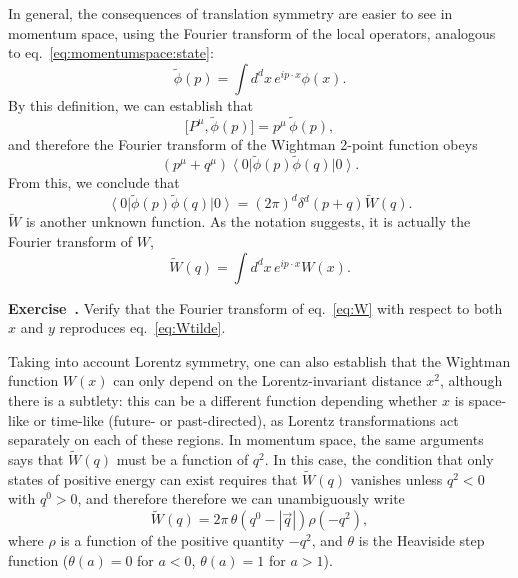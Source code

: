 \documentclass[a4paper,12pt]{article}
\newcommand{\ket}[1]{\left| #1 \right\rangle}
\newcommand{\bra}[1]{\left\langle #1 \right|}
\numberwithin{equation}{section}
\newcounter{exercise}[section]
\newenvironment{exercise}[1][]%
	{\refstepcounter{exercise}\bigskip
	\begin{mdframed}[backgroundcolor=gray!20, linewidth=0]
	\noindent\textbf{Exercise~\thesection.\theexercise #1} \rmfamily}
  	{\end{mdframed}\bigskip}
\begin{document}
In general, the consequences of translation symmetry are easier to see in momentum space, using the Fourier transform of the local operators, analogous to eq.~\eqref{eq:momentumspace:state}: 
\begin{equation}
	\widetilde{\phi}(p)
	= \int d^dx \, e^{i p \cdot x} \phi(x).
	\label{eq:momentumspace}
\end{equation}
By this definition, we can establish that
\begin{equation}
	\big[ P^\mu, \widetilde{\phi}(p) \big]
	= p^\mu \, \widetilde{\phi}(p),
	\label{eq:commutator:P:momentum}
\end{equation}
and therefore the Fourier transform of the Wightman 2-point function obeys
\begin{equation}
	(p^\mu + q^\mu)
	\bra{0} \widetilde{\phi}(p) \widetilde{\phi}(q) \ket{0}.
\end{equation}
From this, we conclude that
\begin{equation}
	\bra{0} \widetilde{\phi}(p) \widetilde{\phi}(q) \ket{0}
	= (2\pi)^d \delta^d(p + q) \widetilde{W}(q).
	\label{eq:Wtilde}
\end{equation}
$\widetilde{W}$ is another unknown function. As the notation suggests, it is actually the Fourier transform of $W$,
\begin{equation}
	\widetilde{W}(q) = \int d^dx \, e^{i p \cdot x} W(x).
\end{equation}
%
\begin{exercise}
	Verify that the Fourier transform of eq.~\eqref{eq:W}
	with respect to both $x$ and $y$ reproduces eq.~\eqref{eq:Wtilde}.
\end{exercise}



Taking into account Lorentz symmetry, one can also establish that the Wightman function $W(x)$ can only depend on the Lorentz-invariant distance $x^2$, although there is a subtlety: this can be a different function depending whether $x$ is space-like or time-like (future- or past-directed), as Lorentz transformations act separately on each of these regions.
In momentum space, the same arguments says that $\widetilde{W}(q)$ must be a function of $q^2$. In this case, the condition that only states of positive energy can exist requires that $\widetilde{W}(q)$ vanishes unless $q^2 < 0$ with $q^0 > 0$, and therefore therefore we can unambiguously write
\begin{equation}
	\widetilde{W}(q)
	= 2\pi \, \theta\left( q^0 - \left| \vec{q} \right| \right)
	\rho(-q^2),
	\label{eq:spectraldensity}
\end{equation}
where $\rho$ is a function of the positive quantity $-q^2$, and $\theta$ is the Heaviside step function ($\theta(a) = 0$ for $a < 0$, $\theta(a) = 1$ for $a > 1$).
\end{document}
